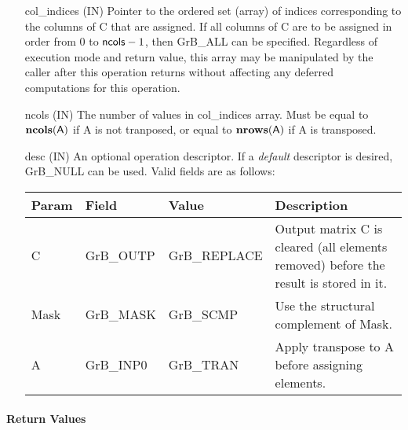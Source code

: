 \begin{itemize}[leftmargin=1in]
    \item[{\sf col\_indices}]  ({\sf IN}) Pointer to the ordered set (array) of 
    indices corresponding to the columns of {\sf C} that are assigned.  If all 
    columns of {\sf C} are to be assigned in order from $0$ to ${\sf ncols} - 1$, 
    then {\sf GrB\_ALL} can be specified.  Regardless of execution mode and return 
    value, this array may be manipulated by the caller after this operation 
    returns without affecting any deferred computations for this operation.
    
    \item[{\sf ncols}] ({\sf IN}) The number of values in {\sf col\_indices} 
	array. Must be equal to $\bold{ncols}({\sf A})$ if {\sf A} is not tranposed,
	or equal to $\bold{nrows}({\sf A})$ if {\sf A} is transposed.

    \item[{\sf desc}]     ({\sf IN}) An optional operation descriptor.  If a 
    \emph{default} descriptor is desired, {\sf GrB\_NULL} can be used.  Valid 
    fields are as follows: \\
    
    \begin{tabular}{lllp{2.5in}}
        Param & Field  & Value & Description \\
        \hline
        {\sf C}    & {\sf GrB\_OUTP} & {\sf GrB\_REPLACE} & Output matrix {\sf C}
        is cleared (all elements removed) before the result is stored in it. \\
        
        {\sf Mask} & {\sf GrB\_MASK} & {\sf GrB\_SCMP}   & Use the structural 
        complement of {\sf Mask}. \\

        {\sf A}    & {\sf GrB\_INP0} & {\sf GrB\_TRAN}   & Apply transpose to 
        {\sf A} before assigning elements.
    \end{tabular}
\end{itemize}

\paragraph{Return Values}


